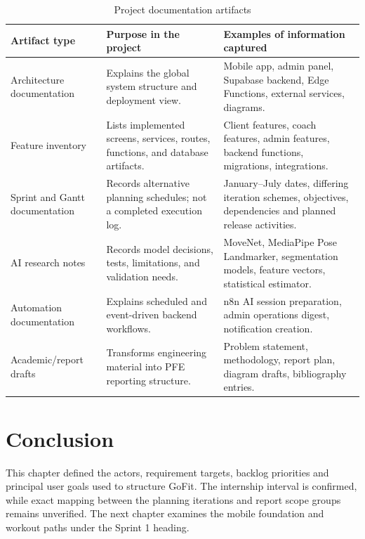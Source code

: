 \documentclass[12pt,a4paper,openany]{report}
\begin{document}
\begingroup
\footnotesize
\setlength{\tabcolsep}{3pt}
\renewcommand{\arraystretch}{1.20}
\setlength{\LTpre}{5pt}
\setlength{\LTpost}{10pt}
\begin{longtable}{|L{3.67cm}|L{5.29cm}|L{5.73cm}|}
\caption{Project documentation artifacts}\label{tab:pdf-27-15} \\
\hline
Artifact type & Purpose in the project & Examples of information captured \\ \hline
Architecture documentation & Explains the global system structure and deployment view. & Mobile app, admin panel, Supabase backend, Edge Functions, external services, diagrams. \\ \hline
Feature inventory & Lists implemented screens, services, routes, functions, and database artifacts. & Client features, coach features, admin features, backend functions, migrations, integrations. \\ \hline
Sprint and Gantt documentation & Records alternative planning schedules; not a completed execution log. & January--July dates, differing iteration schemes, objectives, dependencies and planned release activities. \\ \hline
AI research notes & Records model decisions, tests, limitations, and validation needs. & MoveNet, MediaPipe Pose Landmarker, segmentation models, feature vectors, statistical estimator. \\ \hline
Automation documentation & Explains scheduled and event-driven backend workflows. & n8n AI session preparation, admin operations digest, notification creation. \\ \hline
Academic/report drafts & Transforms engineering material into PFE reporting structure. & Problem statement, methodology, report plan, diagram drafts, bibliography entries. \\ \hline
\end{longtable}
\endgroup

\section*{Conclusion}

This chapter defined the actors, requirement targets, backlog priorities and principal user goals used to structure GoFit. The internship interval is confirmed, while exact mapping between the planning iterations and report scope groups remains unverified. The next chapter examines the mobile foundation and workout paths under the Sprint 1 heading.
\end{document}
